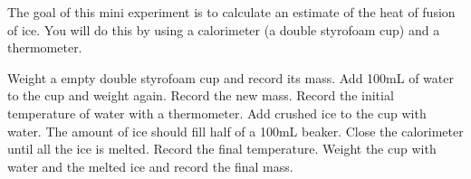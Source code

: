 \documentclass[main.tex]{subfiles}
\begin{document}
\newpage
 
\vspace{0.2cm}{\large \bfseries 3. Heat of fusion of ice}
The goal of this mini experiment is to calculate an estimate of the heat of fusion of ice. You will do this by using a calorimeter (a double styrofoam cup) and a thermometer.
\begin{steps}
    \newstep[] Weight a empty double styrofoam cup and record its mass.
 \newstep[] Add 100mL of water to the cup and weight again. Record the new mass.
  \newstep[] Record the initial temperature of water with a thermometer.
   \newstep[] Add crushed ice to the cup with water. The amount of ice should fill half of a 100mL beaker. 
    \newstep[] Close the calorimeter until all the ice is melted. Record the final temperature.
     \newstep[] Weight the cup with water and the melted ice and record the final mass.
\end{steps}
\end{document}
